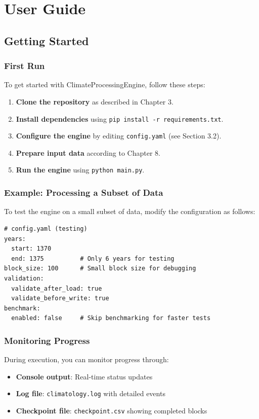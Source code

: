 ﻿\documentclass[12pt,a4paper]{report}
\begin{document}
\chapter{User Guide}
\section{Getting Started}

\subsection{First Run}
To get started with ClimateProcessingEngine, follow these steps:

\begin{enumerate}
    \item \textbf{Clone the repository} as described in Chapter 3.
    \item \textbf{Install dependencies} using \texttt{pip install -r requirements.txt}.
    \item \textbf{Configure the engine} by editing \texttt{config.yaml} (see Section 3.2).
    \item \textbf{Prepare input data} according to Chapter 8.
    \item \textbf{Run the engine} using \texttt{python main.py}.
\end{enumerate}

\subsection{Example: Processing a Subset of Data}
To test the engine on a small subset of data, modify the configuration as follows:

\begin{lstlisting}[caption=Testing Configuration]
# config.yaml (testing)
years:
  start: 1370
  end: 1375          # Only 6 years for testing
block_size: 100      # Small block size for debugging
validation:
  validate_after_load: true
  validate_before_write: true
benchmark:
  enabled: false     # Skip benchmarking for faster tests
\end{lstlisting}

\subsection{Monitoring Progress}
During execution, you can monitor progress through:
\begin{itemize}
    \item \textbf{Console output}: Real-time status updates
    \item \textbf{Log file}: \texttt{climatology.log} with detailed events
    \item \textbf{Checkpoint file}: \texttt{checkpoint.csv} showing completed blocks
\end{itemize}
\end{document}
